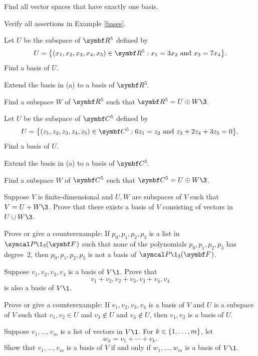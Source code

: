 \begin{exercises}

\exercise
Find all vector spaces that have exactly one basis.


\exercise
Verify all assertions in Example \ref{bases}.


\exercise
\begin{SUBtheorem}
\item
Let $U$ be the subspace of $\R{5}$ defined by
\[
U =
\br[\big]{ (x_1, x_2, x_3, x_4, x_5) \in \R{5}: x_1 = 3 x_2 \mbox{\ and\ } x_3 = 7x_4}.
\]
Find a basis of $U$.
\item
Extend the basis in (a) to a basis of $\RR5$.
\item
Find a subspace $W$ of $\R5$ such that $\R5 = U \oplus W\3$.
\end{SUBtheorem}


\exercise
\begin{SUBtheorem}
\item
Let $U$ be the subspace of $\C{5}$ defined by
\[
U =
\br[\big]{ (z_1, z_2, z_3, z_4, z_5) \in \C{5}: 6 z_1 = z_2 \mbox{\ and\ } z_3 + 2z_4 + 3z_5 = 0}.
\]
Find a basis of $U$.
\item
Extend the basis in (a) to a basis of $\CC5$.
\item
Find a subspace $W$ of $\C5$ such that $\C5 = U \oplus W\3$.
\end{SUBtheorem}


\exercise
Suppose $V$ is finite-dimensional and $U, W$ are subspaces of $V$ such that $V = U + W\3$. Prove that there exists a basis of $V$ consisting of vectors in $U \cup W\3$.


\exercise
Prove or give a counterexample: If $p_0, p_1, p_2, p_3$ is a list in $\P\1_3(\F{})$ such
that none of the polynomials $p_0, p_1, p_2, p_3$ has degree~$2$, then $p_0, p_1, p_2, p_3$ is not a basis of $\P\1_3(\F{})$.


\exercise
Suppose $v_1, v_2, v_3, v_4$ is a basis of $V\1$. Prove that
\[
v_1 + v_2, v_2 + v_3, v_3 + v_4, v_4
\]
is also a basis of $V\1$.


\exercise
Prove or give a counterexample: If $v_1, v_2, v_3, v_4$ is a basis of $V$ and $U$ is a subspace of $V$ such that $v_1, v_2 \in U$ and $v_3 \notin U$ and $v_4 \notin U$, then $v_1, v_2$ is a basis of $U$.


\exercise
Suppose $v_1, \ldots, v_m$ is a list of vectors in $V\1$. For $k \in \{1, \ldots, m\}$, let
\[
w_k = v_1 + \cdots + v_k.
\]
Show that $v_1, \ldots, v_m$ is a basis of $V$ if and only if $w_1, \ldots, w_m$ is a basis of $V\1$.



\end{exercises}
